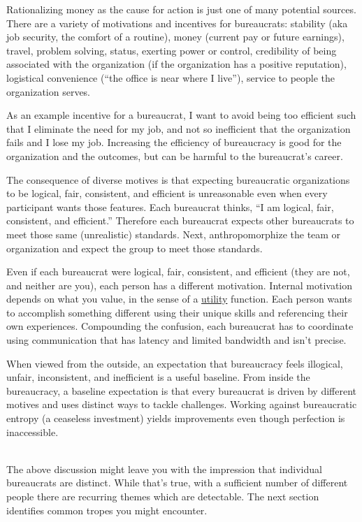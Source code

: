 Rationalizing money as the cause for action is just one of many potential sources.
There are a variety of motivations and incentives for bureaucrats: 
stability (aka job security, the comfort of a routine),
money (current pay or future earnings), 
travel, 
problem solving, 
status, 
exerting power or control, 
credibility of being associated with the organization (if the organization has a positive reputation), 
logistical convenience (``the office is near where I live''), 
service to people the organization serves.


As an example incentive for a bureaucrat, I want to avoid being too efficient such that I eliminate the need for my job, 
and not so inefficient that the organization fails and I lose my job. Increasing the efficiency of bureaucracy is good for the organization and the outcomes, but can be harmful to the bureaucrat's career.


The consequence of diverse motives is that expecting bureaucratic organizations to be logical, fair, consistent, and efficient is unreasonable even when every participant wants those features. Each bureaucrat thinks, ``I am logical, fair, consistent, and efficient.'' Therefore each bureaucrat expects other bureaucrats to meet those same (unrealistic) standards. Next, anthropomorphize the team or organization and expect the group to meet those standards. 

Even if each bureaucrat were logical, fair, consistent, and efficient (they are not, and neither are you), each person has a different motivation. Internal motivation depends on what you value, in the sense of a
\href{https://en.wikipedia.org/wiki/Utility}{utility}
function.  Each person wants to accomplish something different using their unique skills and referencing their own experiences. Compounding the confusion, each bureaucrat has to coordinate using communication that has latency and limited bandwidth and isn't precise.

When viewed from the outside, an expectation that bureaucracy feels illogical, unfair, inconsistent, and inefficient is a useful baseline. From inside the bureaucracy, a baseline expectation is that every bureaucrat is driven by different motives and uses distinct ways to tackle challenges. Working against bureaucratic entropy (a ceaseless investment) yields improvements even though perfection is inaccessible.


\ \\


The above discussion might leave you with the impression that individual bureaucrats are distinct. While that's true, with a sufficient number of different people there are recurring themes which are detectable. The next section identifies common tropes you might encounter.